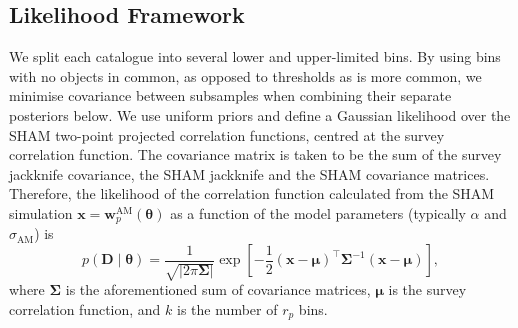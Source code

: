 \documentclass[usenatbib,useAMS]{mnras}
\newcommand{\D}{\ensuremath{\mathrm{\bm{D}}}}
\newcommand{\scatter}{\ensuremath{\sigma_{\mathrm{AM}}}}
\begin{document}
\subsection{Likelihood Framework}\label{sec:likelihood}

We split each catalogue into several lower and upper-limited bins. By using bins with no objects in common, as opposed to thresholds as is more common, we {minimise} covariance between subsamples when combining their separate posteriors below. We use uniform priors and define a Gaussian likelihood over the \ac{SHAM} two-point projected correlation functions, centred at the survey correlation function. The covariance matrix is taken to be the sum of the survey jackknife covariance, the \ac{SHAM} jackknife and the \ac{SHAM} covariance matrices. Therefore, the likelihood of the correlation function calculated from the \ac{SHAM} simulation $\bm{x} = \bm{w}_{p}^{\mathrm{AM}}\left(\bm{\theta}\right)$ as a function of the model parameters (typically $\alpha$ and $\scatter$) is
% 
\begin{equation}
    p\left(\D \mid \bm{\theta}\right)
    =
    \frac{1}{\sqrt{\left|2 \pi \bm{\Sigma}\right|}}
    \exp{\left[-\frac{1}{2} \left(\bm{x} - \bm{\mu}\right)^\intercal
    \bm{\Sigma}^{-1}
    \left(\bm{x} - \bm{\mu}\right)
    \right]},
\end{equation}
% 
where $\bm{\Sigma}$ is the aforementioned sum of covariance matrices, $\bm{\mu}$ is the survey correlation function, and $k$ is the number of $r_p$ bins.
\end{document}
